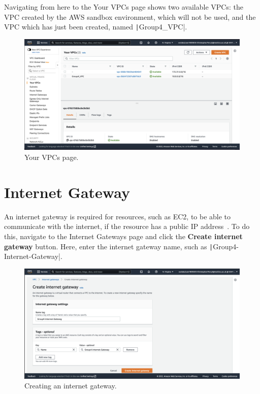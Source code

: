 Navigating from here to the Your VPCs page shows two available VPCs: the VPC created by the AWS sandbox
environment, which will not be used, and the VPC which has just been created, named \texttt|Group4_VPC|.

\begin{figure}[!htbp]
    \centering
    \includegraphics[width=150mm]{resources/vpc/your_vpcs}
    \caption{Your VPCs page.}
    \label{fig:vpc-step-5}
\end{figure}

\clearpage
\section{Internet Gateway}\label{sec:internet-gateway}

An internet gateway is required for resources, such as EC2, to be able to communicate with the internet, if the resource
has a public IP address~\parencite{amazon2022connect}.
To do this, navigate to the Internet Gateways page and click the \textbf{Create internet gateway} button.
Here, enter the internet gateway name, such as \texttt|Group4-Internet-Gateway|.

\begin{figure}[!htbp]
    \centering
    \includegraphics[width=150mm]{resources/vpc/internet-gateway-1}
    \caption{Creating an internet gateway.}
    \label{fig:internet-gateway-1}
\end{figure}

